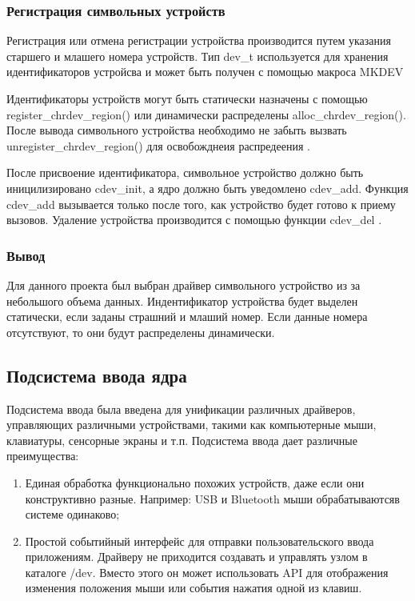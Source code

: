 \subsubsection{Регистрация символьных устройств}
Регистрация или отмена регистрации устройства производится путем указания старшего и млашего номера устройств.
Тип dev\_t используется для хранения идентификаторов устройсва и может быть получен с помощью макроса MKDEV

Идентификаторы устройств могут быть статически назначены с помощью register\_chrdev\_region() или динамически распределены alloc\_chrdev\_region().
После вывода символьного устройства необходимо не забыть вызвать unregister\_chrdev\_region() для освобожднеия распредеения \cite{7}.

После присвоение идентификатора, символьное устройство должно быть иницилизировано cdev\_init, а ядро должно быть уведомлено cdev\_add.
Функция cdev\_add вызывается только после того, как устройство будет готово к приему вызовов.
Удаление устройства производится с помощью функции cdev\_del \cite{7}.

\subsubsection{Вывод}
Для данного проекта был выбран драйвер символьного устройство из за небольшого объема данных.
Индентификатор устройства будет выделен статически, если заданы страшний и млаший номер.
Если данные номера отсутствуют, то они будут распределены динамически.

\subsection{Подсистема ввода ядра}
Подсистема ввода была введена для унификации различных драйверов, управляющих различными устройствами, такими как компьютерные мыши, клавиатуры, сенсорные экраны и т.п. Подсистема ввода дает различные преимущества:
\begin{enumerate}
	\item Единая обработка функционально похожих устройств, даже если они конструктивно разные. 
	Например: USB и Bluetooth мыши обрабатываютсяв системе одинаково;
	\item Простой событийный интерфейс для отправки пользовательского ввода приложениям. 
	Драйверу не приходится создавать и управлять узлом в каталоге /dev. 
	Вместо этого он может использовать API для отображения изменения положения мыши или события нажатия одной из клавиш. 
\end{enumerate}

